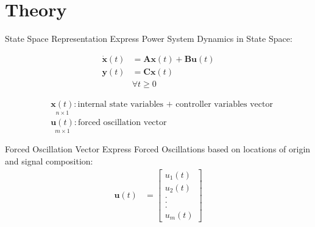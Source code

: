 \section[Theory]{Theory}
\label{sec:lasso_theory}

\begin{frame}[fragile]{State Space Representation}
	Express Power System Dynamics in State Space:

		\begin{align*}
			\dot{\textbf{x}}(t) &= 
			\textbf{A}\textbf{x}(t)
			+ \textbf{B}\textbf{u}(t)\\
			\textbf{y}(t) &= 
			\textbf{C}\textbf{x}(t)\\  
			& \forall t\geq0	
		\end{align*}
	
	\begin{align*}
		& \underset{\scriptscriptstyle n\times 1}{\textbf{x}(t)} : \text{internal state variables + controller variables vector}                                                                      \\
		& \underset{\scriptscriptstyle m\times 1}{\textbf{u}(t)} : \text{forced oscillation vector}
	\end{align*}
\end{frame}

\begin{frame}[fragile]{Forced Oscillation Vector}
	Express Forced Oscillations based on locations of origin and signal composition:
		\begin{align*}
			\textbf{u}(t) &= 
			\begin{bmatrix}
				u_1(t) \\
				u_2(t) \\
				. \\
				. \\
				. \\
				u_m(t)
			\end{bmatrix}		
		\end{align*}
	
\end{frame}